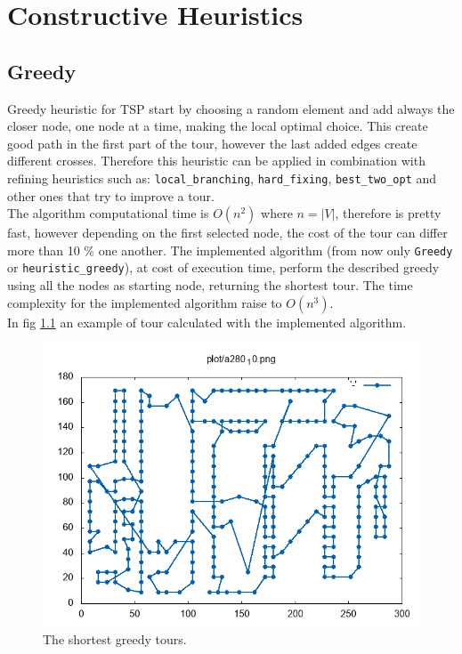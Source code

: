 \chapter{Constructive Heuristics}

\section{Greedy}\label{sec:greedy}
Greedy heuristic for TSP start by choosing a random element and add always the closer node, one node at a time, making the local optimal choice. This create good path in the first part of the tour, however the last added edges create different crosses. Therefore this heuristic can be applied in combination with refining heuristics such as: \texttt{local\_branching}, \texttt{hard\_fixing}, \texttt{best\_two\_opt} and other ones that try to improve a tour.\\
The algorithm computational time is $ O(n^2) $ where $ n = |V| $, therefore is pretty fast, however depending on the first selected node, the cost of the tour can differ more than 10 \% one another. The implemented algorithm (from now only \texttt{Greedy} or \texttt{heuristic\_greedy}), at cost of execution time, perform the described greedy using all the nodes as starting node, returning the shortest tour. The time complexity for the implemented algorithm raise to $ O(n^3) $.\\
In fig \ref{fig:a280_10_} an example of tour calculated with the implemented algorithm.

\begin{figure}[h]
	\centering
	\centering
	\includegraphics[width=0.7\columnwidth]{../res/a280_10.png}
	\caption{The shortest greedy tours.}
	\label{fig:a280_10_}
\end{figure}




